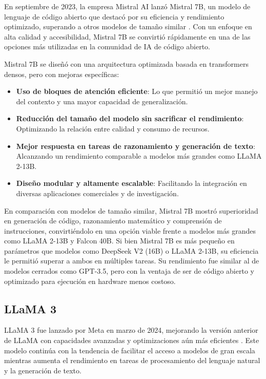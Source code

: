 En septiembre de 2023, la empresa Mistral AI lanzó Mistral 7B, un modelo de lenguaje de código abierto que destacó por su eficiencia y rendimiento optimizado, superando a otros modelos de tamaño similar \cite{jiang2023mistral7b}. 
Con un enfoque en alta calidad y accesibilidad, Mistral 7B se convirtió rápidamente en una de las opciones más utilizadas en la comunidad de IA de código abierto.

Mistral 7B se diseñó con una arquitectura optimizada basada en transformers densos, pero con mejoras específicas:

\begin{itemize}
    \item \textbf{Uso de bloques de atención eficiente}: Lo que permitió un mejor manejo del contexto y una mayor capacidad de generalización.
    \item \textbf{Reducción del tamaño del modelo sin sacrificar el rendimiento}: Optimizando la relación entre calidad y consumo de recursos.
    \item \textbf{Mejor respuesta en tareas de razonamiento y generación de texto}: Alcanzando un rendimiento comparable a modelos más grandes como LLaMA 2-13B.
    \item \textbf{Diseño modular y altamente escalable}: Facilitando la integración en diversas aplicaciones comerciales y de investigación.
\end{itemize}

En comparación con modelos de tamaño similar, Mistral 7B mostró superioridad en generación de código, razonamiento matemático y comprensión de instrucciones, convirtiéndolo en una opción viable frente a modelos más grandes como LLaMA 2-13B y Falcon 40B.
Si bien Mistral 7B es más pequeño en parámetros que modelos como DeepSeek V2 (16B) o LLaMA 2-13B, su eficiencia le permitió superar a ambos en múltiples tareas. Su rendimiento fue similar al de modelos cerrados como GPT-3.5, pero con la ventaja de ser de código abierto y optimizado para ejecución en hardware menos costoso.


\subsection{LLaMA 3}

LLaMA 3 fue lanzado por Meta en marzo de 2024, mejorando la versión anterior de LLaMA con capacidades avanzadas y optimizaciones aún más eficientes \cite{grattafiori2024llama3herdmodels}. 
Este modelo continúa con la tendencia de facilitar el acceso a modelos de gran escala mientras aumenta el rendimiento en tareas de procesamiento del lenguaje natural y la generación de texto.

